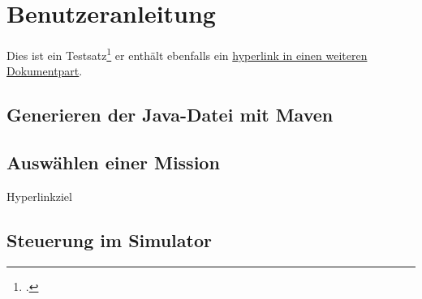 \chapter{Benutzeranleitung}

Dies ist ein Testsatz\footcite{NASA:1} er enthält ebenfalls ein \hyperlink{testtarget}{hyperlink in einen weiteren Dokumentpart}.

\section{Generieren der Java-Datei mit Maven}

\newpage
\section{Auswählen einer Mission}
\newpage
\hypertarget{testtarget}{Hyperlinkziel}
\newpage
\section{Steuerung im Simulator}
\newpage
\newpage